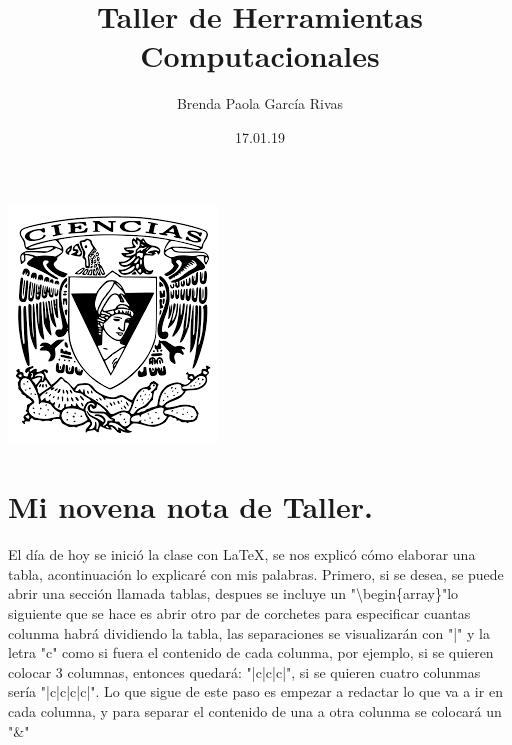 \documentclass{article}
\title{\huge \color{red}Taller de Herramientas Computacionales}
\author{Brenda Paola García Rivas}
\date{17.01.19}
\begin{document}
\maketitle
\begin{center}
	\includegraphics[scale=1.30]{1.png}
\end{center}
\newpage
\section{Mi novena nota de Taller.}
El día de hoy se inició la clase con LaTeX, se nos explicó cómo elaborar una tabla, acontinuación lo explicaré con mis palabras. Primero, si se desea, se puede abrir una sección llamada tablas, despues se incluye un "\textbackslash begin\{array\}"lo siguiente que se hace es abrir otro par de corchetes para especificar cuantas colunma habrá dividiendo la tabla, las separaciones se visualizarán con "|" y la letra "c" como si fuera el contenido de cada colunma, por ejemplo, si se quieren colocar 3 columnas, entonces quedará: "|c|c|c|", si se quieren cuatro colunmas sería "|c|c|c|c|".
Lo que sigue de este paso es empezar a redactar lo que va a ir en cada columna, y para separar el contenido de una a otra colunma se colocará un "\&"
\end{document}

